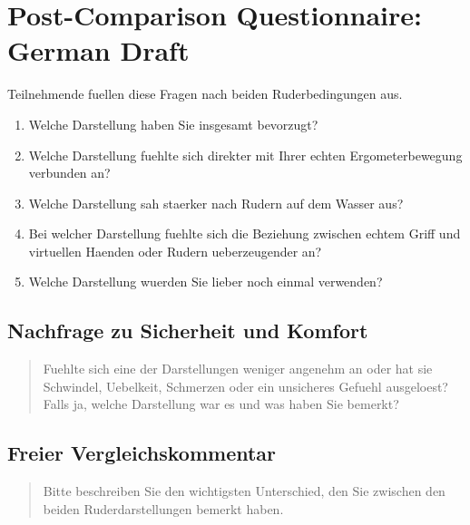 \section{Post-Comparison Questionnaire: German Draft}
\label{app:questionnaires_post_comparison_german}

Teilnehmende fuellen diese Fragen nach beiden Ruderbedingungen aus.


\begin{enumerate}
    \item Welche Darstellung haben Sie insgesamt bevorzugt?
    \item Welche Darstellung fuehlte sich direkter mit Ihrer echten Ergometerbewegung verbunden an?
    \item Welche Darstellung sah staerker nach Rudern auf dem Wasser aus?
    \item Bei welcher Darstellung fuehlte sich die Beziehung zwischen echtem Griff und virtuellen Haenden oder Rudern ueberzeugender an?
    \item Welche Darstellung wuerden Sie lieber noch einmal verwenden?
\end{enumerate}

\subsection*{Nachfrage zu Sicherheit und Komfort}

\begin{quote}
Fuehlte sich eine der Darstellungen weniger angenehm an oder hat sie Schwindel, Uebelkeit, Schmerzen oder ein unsicheres Gefuehl ausgeloest? Falls ja, welche Darstellung war es und was haben Sie bemerkt?
\end{quote}

\subsection*{Freier Vergleichskommentar}

\begin{quote}
Bitte beschreiben Sie den wichtigsten Unterschied, den Sie zwischen den beiden Ruderdarstellungen bemerkt haben.
\end{quote}
